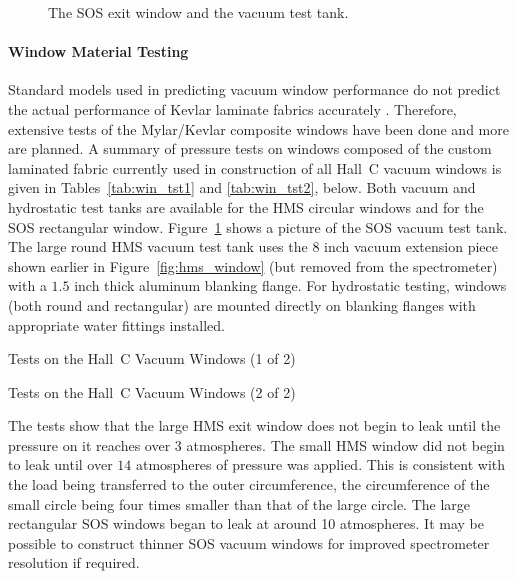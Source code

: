 \begin{figure}
\caption{The SOS exit window and the vacuum test tank. \label{fig:sos_window}}
\end{figure}

\paragraph{Window Material Testing}

Standard models used in predicting vacuum
window performance do not predict the actual performance of Kevlar laminate
fabrics accurately \cite{rbrook1,rllnl2}. Therefore, extensive tests of the
Mylar/Kevlar composite windows have been done and more are planned.
A summary of pressure
tests on windows composed of the custom laminated
fabric currently used in construction of all Hall~C vacuum windows is
given in Tables~\ref{tab:win_tst1} and \ref{tab:win_tst2}, below. Both vacuum and hydrostatic test 
tanks
are available for the HMS circular windows and for the SOS rectangular
window. Figure~\ref{fig:sos_window} shows a picture of the SOS vacuum
test tank.  The large round
HMS vacuum test tank uses the $8$ inch vacuum extension piece shown
earlier in Figure~\ref{fig:hms_window} (but removed from the spectrometer) with a $1.5$
inch thick aluminum blanking flange. For hydrostatic testing, windows (both
round and rectangular) are mounted directly on
blanking flanges with appropriate water fittings installed.

\begin{table}
\caption{Tests on the Hall~C Vacuum Windows (1 of 2) \label{tab:win_tst1}} 
\end{table}
\clearpage

\begin{table}
\caption{Tests on the Hall~C Vacuum Windows (2 of 2) \label{tab:win_tst2}}
\end{table}
\clearpage

The tests show that the large HMS exit window does not begin to leak until
the pressure on it reaches over $3$ atmospheres. The small HMS window
did not begin to leak until over $14$ atmospheres of pressure was applied.
This is consistent with the load being transferred to
the outer circumference, the circumference of the small circle being four
times smaller than that of the large circle. The large rectangular SOS windows
began to leak at around 10 atmospheres. It may be possible to construct thinner
SOS vacuum windows for improved spectrometer resolution if required.

